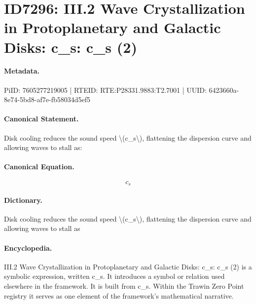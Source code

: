 \section*{ID7296: III.2 Wave Crystallization in Protoplanetary and Galactic Disks: c\_s: c\_s (2)}
\paragraph{Metadata.}
PiID: 7605277219005 | RTEID: RTE:P28331.9883:T2.7001 | UUID: 6423660a-8e74-5bd8-af7e-fb58034d5ef5

\paragraph{Canonical Statement.}
Disk cooling reduces the sound speed \textbackslash{}(c\_s\textbackslash{}), flattening the dispersion curve and allowing waves to stall as:

\paragraph{Canonical Equation.}
\[
c_s
\]

\paragraph{Dictionary.}
Disk cooling reduces the sound speed \textbackslash{}(c\_s\textbackslash{}), flattening the dispersion curve and allowing waves to stall as

\paragraph{Encyclopedia.}
III.2 Wave Crystallization in Protoplanetary and Galactic Disks: c\_s: c\_s (2) is a symbolic expression, written c\_s. It introduces a symbol or relation used elsewhere in the framework. It is built from c\_s. Within the Trawin Zero Point registry it serves as one element of the framework's mathematical narrative.
